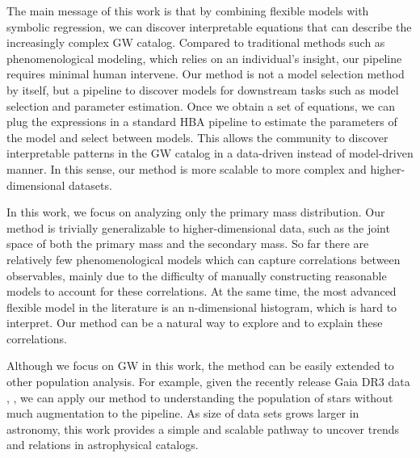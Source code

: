 \documentclass[nohyperref]{article}
\theoremstyle{plain}
\theoremstyle{definition}
\theoremstyle{remark}
\begin{document}
The main message of this work is that by combining flexible models with symbolic regression, we can discover interpretable equations that can describe the increasingly complex GW catalog.
Compared to traditional methods such as phenomenological modeling, which relies on an individual's insight,
our pipeline requires minimal human intervene.
Our method is not a model selection method by itself, but a pipeline to discover models for downstream tasks such as model selection and parameter estimation.
Once we obtain a set of equations, we can plug the expressions in a standard HBA pipeline to estimate the parameters of the model and select between models.
This allows the community to discover interpretable patterns in the GW catalog in a data-driven instead of model-driven manner.
In this sense, our method is more scalable to more complex and higher-dimensional datasets.

In this work, we focus on analyzing only the primary mass distribution.
Our method is trivially generalizable to higher-dimensional data, such as the joint space of both the primary mass and the secondary mass.
So far there are relatively few phenomenological models which can capture correlations between observables,
mainly due to the difficulty of manually constructing reasonable models to account for these correlations.
At the same time, the most advanced flexible model in the literature is an n-dimensional histogram, which is hard to interpret.
Our method can be a natural way to explore and to explain these correlations.

Although we focus on GW in this work, the method can be easily extended to other population analysis.
For example, given the recently release Gaia DR3 data \cite{2016A&A...595A...1G}, , we can apply our method to understanding the population of stars without much augmentation to the pipeline.
As size of data sets grows larger in astronomy, this work provides a simple and scalable pathway to uncover trends and relations in astrophysical catalogs.




\end{document}
